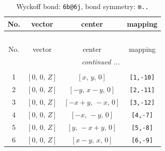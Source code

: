 \documentclass[fleqn,8pt]{jsarticle}
\begin{document}
\begin{longtable}{cccc}
\caption{Wyckoff bond: {\tt 6b@6j}, bond symmetry: {\tt m..}}
 \\
 \hline \hline
No. & vector & center & mapping \\ \hline \endfirsthead

\multicolumn{3}{l}{\tablename\ \thetable{}} \\
 \hline \hline
No. & vector & center & mapping \\ \hline \endhead

 \hline \hline
\multicolumn{3}{r}{\footnotesize\it continued ...} \\ \endfoot

 \hline \hline
\multicolumn{3}{r}{} \\ \endlastfoot

1 & $\left[ 0,\, 0,\, Z \right]$ & $\left[ x,\, y,\, 0 \right]$ & {\tt [1,-10]} \\ \hline
2 & $\left[ 0,\, 0,\, Z \right]$ & $\left[ - y,\, x - y,\, 0 \right]$ & {\tt [2,-11]} \\ \hline
3 & $\left[ 0,\, 0,\, Z \right]$ & $\left[ - x + y,\, - x,\, 0 \right]$ & {\tt [3,-12]} \\ \hline
4 & $\left[ 0,\, 0,\, Z \right]$ & $\left[ - x,\, - y,\, 0 \right]$ & {\tt [4,-7]} \\ \hline
5 & $\left[ 0,\, 0,\, Z \right]$ & $\left[ y,\, - x + y,\, 0 \right]$ & {\tt [5,-8]} \\ \hline
6 & $\left[ 0,\, 0,\, Z \right]$ & $\left[ x - y,\, x,\, 0 \right]$ & {\tt [6,-9]} \\
\end{longtable}
\renewcommand{\arraystretch}{1.2}
\end{document}
